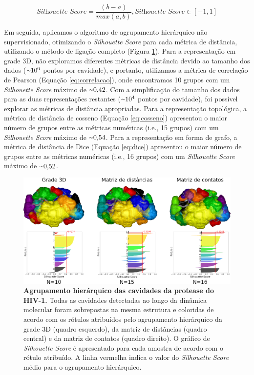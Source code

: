 \documentclass[Portugues]{phdquali}
\newcommand{\aproximadamente}{\raise.2ex\hbox{$\scriptstyle\sim$}}
\def\ie{i.e.\onedot}
\begin{document}
\begin{equation}
  \textit{Silhouette Score} = \frac{(b - a)}{max(a, b)}, \textit{Silhouette Score} \in [-1, 1]
  \label{eq:silhouette-score}
\end{equation}

Em seguida, aplicamos o algoritmo de agrupamento hierárquico não supervisionado, otimizando o \textit{Silhouette Score} para cada métrica de distância, utilizando o método de ligação completo (Figura \ref{fig:hiv-1-clustering-results}). Para a representação em grade 3D, não exploramos diferentes métricas de distância devido ao tamanho dos dados ($\aproximadamente 10^6$ pontos por cavidade), e portanto, utilizamos a métrica de correlação de Pearson (Equação \ref{eq:correlacao}), onde encontramos 10 grupos com um \textit{Silhouette Score} máximo de $\aproximadamente 0{,}42$. Com a simplificação do tamanho dos dados para as duas representações restantes ($\aproximadamente 10^4$ pontos por cavidade), foi possível explorar as métricas de distância apropriadas. Para a representação topológica, a métrica de distância de cosseno (Equação \ref{eq:cosseno}) apresentou o maior número de grupos entre as métricas numéricas (\ie, 15 grupos) com um \textit{Silhouette Score} máximo de $\aproximadamente 0{,}54$. Para a representação em forma de grafo, a métrica de distância de Dice (Equação \ref{eq:dice}) apresentou o maior número de grupos entre as métricas numéricas (\ie, 16 grupos) com um \textit{Silhouette Score} máximo de $\aproximadamente 0{,}52$.

\begin{figure}[h]
  \centering
  \includegraphics[scale=1.1]{images/HIV-1-clustering-results.png}
  \caption[Agrupamento hierárquico das cavidades da protease do HIV-1]{\textbf{Agrupamento hierárquico das cavidades da protease do HIV-1.} Todas as cavidades detectadas ao longo da dinâmica molecular foram sobrepostas na mesma estrutura e coloridas de acordo com os rótulos atribuídos pelo agrupamento hierárquico da grade 3D (quadro esquerdo), da matriz de distâncias (quadro central) e da matriz de contatos (quadro direito). O gráfico de \textit{Silhouette Score} é apresentado para cada amostra de acordo com o rótulo atribuído. A linha vermelha indica o valor do \textit{Silhouette Score} médio para o agrupamento hierárquico.}
  \label{fig:hiv-1-clustering-results}
\end{figure}
\end{document}
